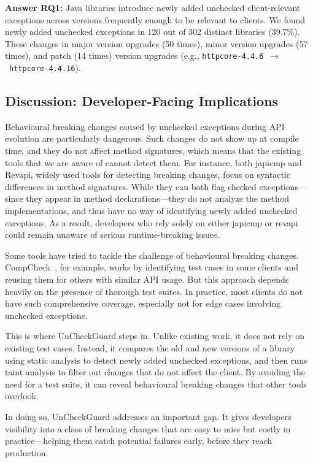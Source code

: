 \vspace{1em}
\begin{tcolorbox}[colback=gray!10, colframe=black]
\textbf{Answer RQ1:} Java libraries introduce newly added unchecked client-relevant exceptions across versions frequently enough to be relevant to clients. We found newly added unchecked exceptions in 120 out of 302 distinct libraries (39.7\%). These changes in major version upgrades (50 times), minor version upgrades (57 times), and patch (14 times) version upgrades (e.g., \texttt{httpcore-4.4.6}~$\rightarrow$~\texttt{httpcore-4.4.16}).
\end{tcolorbox}
\vspace{1em}

\subsection{Discussion: Developer-Facing Implications}

Behavioural breaking changes caused by unchecked exceptions during API evolution are particularly dangerous. Such changes do not show up at compile time, and they do not affect method signatures, which means that the existing tools that we are aware of cannot detect them. For instance, both japicmp and Revapi, widely used tools for detecting breaking changes, focus on syntactic differences in method signatures. While they can both flag checked exceptions—since they appear in method declarations—they do not analyze the method implementations, and thus have no way of identifying newly added unchecked exceptions. As a result, developers who rely solely on either japicmp or revapi could remain unaware of serious runtime-breaking issues.

Some tools have tried to tackle the challenge of behavioural breaking changes. CompCheck~\cite{CompCheck}, for example, works by identifying test cases in some clients and reusing them for others with similar API usage. But this approach depends heavily on the presence of thorough test suites. In practice, most clients do not have such comprehensive coverage, especially not for edge cases involving unchecked exceptions.

This is where UnCheckGuard steps in. Unlike existing work, it does not rely on existing test cases. Instead, it compares the old and new versions of a library using static analysis to detect newly added unchecked exceptions, and then runs taint analysis to filter out changes that do not affect the client. By avoiding the need for a test suite, it can reveal behavioural breaking changes that other tools overlook.

In doing so, UnCheckGuard addresses an important gap. It gives developers visibility into a class of breaking changes that are easy to miss but costly in practice—helping them catch potential failures early, before they reach production.
